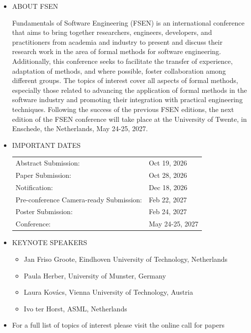 \documentclass[prodmode,acmtecs]{acmsmall} %
\begin{document}
\begin{itemize}\item  ABOUT FSEN 
 
  Fundamentals of Software Engineering (FSEN) is an international conference that aims to bring together researchers, engineers, developers, and practitioners from academia and industry to present and discuss their research work in the area of formal methods for software engineering. Additionally, this conference seeks to facilitate the transfer of experience, adaptation of methods, and where possible, foster collaboration among different groups. The topics of interest cover all aspects of formal methods, especially those related to advancing the application of formal methods in the software industry and promoting their integration with practical engineering techniques. Following the success of the previous FSEN editions, the next edition of the FSEN conference will take place at the University of Twente, in Enschede, the Netherlands, May 24-25, 2027. 
 
\item  IMPORTANT DATES 
 
\begin{tabulary}{\linewidth}{LL}Abstract Submission:  & Oct 19, 2026 \\
Paper Submission:  & Oct 28, 2026 \\
Notification:  & Dec 18, 2026 \\
Pre-conference Camera-ready Submission:  & Feb 22, 2027 \\
Poster Submission:  & Feb 24, 2027 \\
Conference:  & May 24-25, 2027 \\
\end{tabulary}
 
\item  KEYNOTE SPEAKERS 
 
\begin{itemize}\item  Jan Friso Groote, Eindhoven University of Technology, Netherlands
\item  Paula Herber, University of Munster, Germany
\item  Laura Kovács, Vienna University of Technology, Austria
\item  Ivo ter Horst, ASML, Netherlands
\end{itemize} 
\item  For a full list of topics of interest please visit the online call for papers 
 

\end{itemize}
\end{document}
